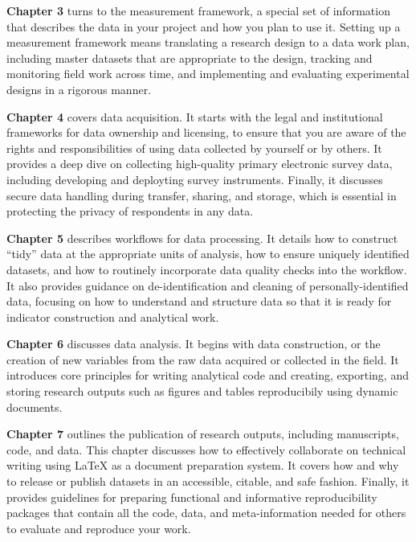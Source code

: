 \textbf{Chapter 3} turns to the measurement framework,
a special set of information that describes the data in your project
and how you plan to use it.
Setting up a measurement framework means translating a research design to a data work plan,
including master datasets that are appropriate to the design,
tracking and monitoring field work across time,
and implementing and evaluating experimental designs in a rigorous manner.

\textbf{Chapter 4} covers data acquisition. It starts with
the legal and institutional frameworks for data ownership and licensing,
to ensure that you are aware of the rights and responsibilities
of using data collected by yourself or by others.
It provides a deep dive on collecting high-quality primary electronic survey data,
including developing and deployting survey instruments.
Finally, it discusses secure data handling during transfer, sharing, and storage,
which is essential in protecting the privacy of respondents in any data.

\textbf{Chapter 5} describes workflows for data processing.
It details how to construct ``tidy'' data at the appropriate units of analysis,
how to ensure uniquely identified datasets, and
how to routinely incorporate data quality checks into the workflow.
It also provides guidance on de-identification and cleaning of personally-identified data,
focusing on how to understand and structure data
so that it is ready for indicator construction and analytical work.

\textbf{Chapter 6} discusses data analysis.
It begins with data construction, or the creation of new variables
from the raw data acquired or collected in the field.
It introduces core principles for writing analytical code
and creating, exporting, and storing research outputs
such as figures and tables reproducibily using dynamic documents.

\textbf{Chapter 7} outlines the publication of research outputs,
including manuscripts, code, and data.
This chapter discusses
how to effectively collaborate on technical writing
using {\LaTeX} as a document preparation system.
It covers how and why to release or publish datasets
in an accessible, citable, and safe fashion.
Finally, it provides guidelines for preparing
functional and informative reproducibility packages
that contain all the code, data, and meta-information needed
for others to evaluate and reproduce your work.

